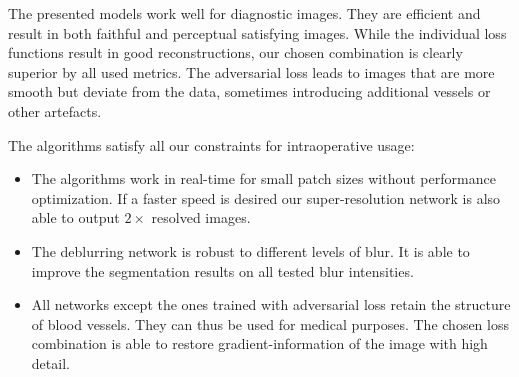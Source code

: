 \documentclass{scrartcl}
\begin{document}
The presented models work well for diagnostic images.
They are efficient and result in both faithful and perceptual satisfying images.
While the individual loss functions result in good reconstructions, our chosen combination is clearly superior by all used metrics.
The adversarial loss leads to images that are more smooth but deviate from the data, sometimes introducing additional vessels or other artefacts.

The algorithms satisfy all our constraints for intraoperative usage:
\begin{itemize}
\item The algorithms work in real-time for small patch sizes without performance optimization.
  If a faster speed is desired our super-resolution network is also able to output $2\times$ resolved images.
\item The deblurring network is robust to different levels of blur.
  It is able to improve the segmentation results on all tested blur intensities.
\item All networks except the ones trained with adversarial loss retain the structure of blood vessels.
  They can thus be used for medical purposes.
  The chosen loss combination is able to restore gradient-information of the image with high detail.
\end{itemize}

\FloatBarrier
\printbibliography
\end{document}
